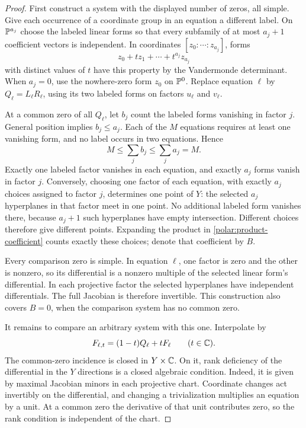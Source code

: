 \begin{proof}
First construct a system with the displayed number of zeros, all simple.
Give each occurrence of a coordinate group in an equation a different
label. On $\mathbb P^{a_j}$ choose the labeled linear forms so that every
subfamily of at most $a_j+1$ coefficient vectors is independent.
In coordinates $[z_0:\cdots:z_{a_j}]$, forms
\[
 z_0+t z_1+\cdots+t^{a_j}z_{a_j}
\]
with distinct values of $t$ have this property by the Vandermonde
determinant. When $a_j=0$, use the nowhere-zero form $z_0$ on $\mathbb P^0$.
Replace equation $\ell$ by $Q_\ell=L_\ell R_\ell$, using its two
labeled forms on factors $u_\ell$ and $v_\ell$.

At a common zero of all $Q_\ell$, let $b_j$ count the labeled forms
vanishing in factor $j$. General position implies $b_j\le a_j$.
Each of the $M$ equations requires at least one vanishing form, and no
label occurs in two equations. Hence
\[
 M\le\sum_j b_j\le\sum_j a_j=M.
\]
Exactly one labeled factor vanishes in each equation, and exactly $a_j$
forms vanish in factor $j$. Conversely, choosing one factor of each
equation, with exactly $a_j$ choices assigned to factor $j$, determines
one point of $Y$: the selected $a_j$ hyperplanes in that factor meet in
one point. No additional labeled form vanishes there, because $a_j+1$
such hyperplanes have empty intersection. Different choices therefore
give different points. Expanding the product in
\eqref{polar:product-coefficient} counts exactly these choices; denote
that coefficient by $B$.

Every comparison zero is simple. In equation $\ell$, one factor is zero
and the other is nonzero, so its differential is a nonzero multiple of
the selected linear form's differential. In each projective factor the
selected hyperplanes have independent differentials. The full Jacobian
is therefore invertible. This construction also covers $B=0$, when the
comparison system has no common zero.

It remains to compare an arbitrary system with this one. Interpolate by
\[
 F_{\ell,t}=(1-t)Q_\ell+tF_\ell\qquad(t\in\mathbb C).
\]
The common-zero incidence is closed in $Y\times\mathbb C$. On it, rank
deficiency of the differential in the $Y$ directions is a closed
algebraic condition. Indeed, it is given by maximal Jacobian minors in
each projective chart. Coordinate changes act invertibly on the
differential, and changing a trivialization multiplies an equation by a
unit. At a common zero the derivative of that unit contributes zero,
so the rank condition is independent of the chart.


\end{proof}
